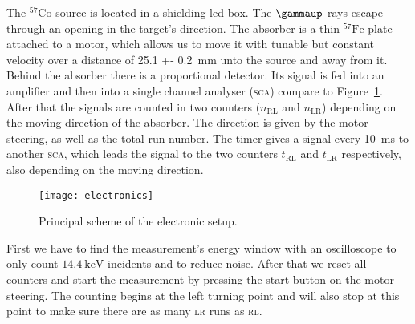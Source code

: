 \documentclass[11pt, english, fleqn, DIV=15, headinclude, BCOR=2cm]{scrreprt}
\begin{document}

The $^{57}\mathrm{Co}$ source is located in a shielding led box. The
$\gammaup$-rays escape through an opening in the target's direction. The
absorber is a thin $^{57}\mathrm{Fe}$ plate attached to a motor, which allows
us to move it with tunable but constant velocity over a distance of \SI{25.1 +-
0.2}{\milli\meter} unto the source and away from it. Behind the absorber there
is a proportional detector. Its signal is fed into an amplifier and then into a
single channel analyser (\textsc{sca}) compare to Figure~\ref{fig:electronics}.
After that the signals are counted in two counters ($n_\text{RL}$ and
$n_\text{LR}$) depending on the moving direction of the absorber. The direction
is given by the motor steering, as well as the total run number. The timer
gives a signal every \SI{10}{\milli\second} to another \textsc{sca}, which
leads the signal to the two counters $t_\text{RL}$ and $t_\text{LR}$
respectively, also depending on the moving direction.


\begin{figure}
    \centering
    \texttt{[image: electronics]}
    \caption{%
        Principal scheme of the electronic setup.
    }
    \label{fig:electronics}
\end{figure}


First we have to find the measurement's energy window with an oscilloscope to only
count $\SI{14.4}{\kilo\electronvolt}$ incidents and to reduce noise. After that
we reset all counters and start the measurement by pressing the start button on
the motor steering. The counting begins at the left turning point and will also
stop at this point to make sure there are as many \textsc{lr} runs as
\textsc{rl}. 
\end{document}
